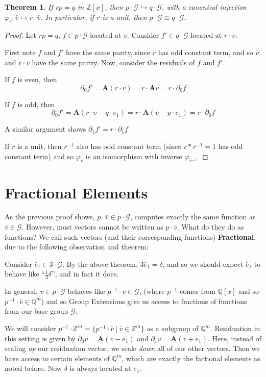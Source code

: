 \documentclass{article}
\newcommand{\G}{\mathcal{G}}
\newcommand{\Z}{\mathbb{Z}}
\newcommand{\Q}{\mathbb{Q}}
\newcommand{\2}{\textbf{2}}
\newcommand{\Am}{\textbf{A}}
\newcommand{\del}{\partial}
\newcommand{\vv}{\bar{v}}
\newcommand{\e}{\bar{e}}
\newtheorem{thm}{Theorem}
\theoremstyle{definition}
\begin{document}
\begin{thm}
  If $rp = q$ in $\Z[x]$, then $p \cdot \G \hookrightarrow q \cdot \G$, 
  with a canonical injection $\varphi_r : \vv \mapsto r \cdot \vv$. 
  In particular, if $r$ is a unit, then $p \cdot \G \cong q \cdot \G$.
\end{thm}

\begin{proof}
  Let $rp = q$, $f \in p \cdot \G$ located at $\vv$. 
  Consider $f' \in q \cdot \G$ located at $r \cdot \vv$.

  First note $f$ and $f'$ have the same parity, since 
  $r$ has odd constant term, and so $\vv$ and $r \cdot \vv$
  have the same parity. Now, consider the residuals of $f$ and $f'$. 
  
  If $f$ is even, then 
  \[ \del_0 f' = \Am (r \cdot \vv) = r \cdot \Am \vv = r \cdot \del_0 f \]

  If $f$ is odd, then
  \[ \del_0 f' = \Am (r \cdot \vv - q \cdot \e_1) 
               = r \cdot \Am (\vv - p \cdot \e_1)
               = r \cdot \del_0 f \]

  A similar argument shows $\del_1 f' = r \cdot \del_1 f$

  If $r$ is a unit, then $r^{-1}$ also has odd constant term 
  (since $r * r^{-1} = 1$ has odd constant term) and so $\varphi_r$
  is an isomorphism with inverse $\varphi_{r^{-1}}$.
\end{proof}

\section{Fractional Elements}
As the previous proof shows, $p \cdot \vv \in p \cdot \G$, 
computes exactly the same function as $\vv \in \G$.
However, most vectors cannot be written as $p \cdot \vv$. 
What do they do as functions?
We call such vectors (and their corresponding functions)
\textbf{Fractional}, due to the following observation and theorem:

Consider $\e_1 \in 3 \cdot \G$. By the above theorem, $3\e_1 = \delta$,
and so we should expect $\e_1$ to behave like ``$\frac{1}{3}\delta$'', 
and in fact it does.

In general, $\vv \in p \cdot \G$ behaves like $p^{-1} \cdot \vv \in \G$,
(where $p^{-1}$ comes from $\Q[x]$ and so $p^{-1} \cdot \vv \in \Q^m$)
and so Group Extensions give us access to fractions of functions from 
our base group $\G$.

We will consider $p^{-1} \cdot \Z^m = \{ p^{-1} \cdot \vv~|~\vv \in \Z^m \}$
as a subgroup of $\Q^m$. Residuation in this setting is given by
$\del_0 \vv = \Am (\vv - \e_1)$ and $\del_1 \vv = \Am (\vv + \e_1)$.
Here, instead of scaling \emph{up} our residuation vector, 
we scale \emph{down} all of our other vectors. Then we have access to 
certain elements of $\Q^m$, which are exactly the factional elements
as noted before. Now $\delta$ is always located at $\e_1$.
\end{document}
